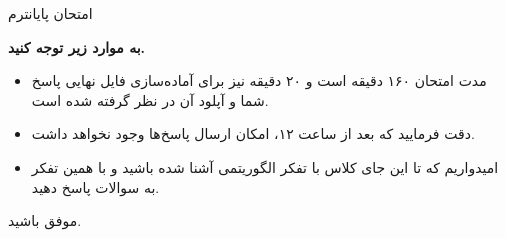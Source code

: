 
\usepackage{template/template}
\usepackage{tabularx}
\usepackage{graphicx}
\graphicspath{ {./images/} }


	\def\ci{\perp\!\!\!\perp}

	

	\header
		{امتحان پایانترم}{}{}{}{}
	

	
		\textbf{به موارد زیر توجه کنید.}
		
		\begin{itemize}
			\item مدت امتحان ۱۶۰ دقیقه است و ۲۰ دقیقه نیز برای آماده‌سازی فایل نهایی پاسخ شما و آپلود آن در نظر گرفته شده است.
			\item دقت فرمایید که بعد از ساعت ۱۲، امکان ارسال پاسخ‌ها وجود نخواهد داشت.
			\item امیدواریم که تا این جای کلاس با تفکر الگوریتمی آشنا شده باشید و با همین تفکر به سوالات پاسخ دهید.
		\end{itemize}
		
	\begin{enumerate}
		\setlength{\itemsep}{30pt}

		\end{enumerate}
	\begin{flushleft}
			موفق باشید. 
	\end{flushleft}

